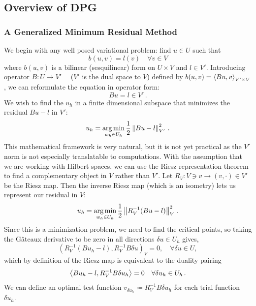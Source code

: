 \documentclass{article}
\begin{document}
\subsection{Overview of DPG}
\subsubsection{A Generalized Minimum Residual Method}
We begin with any well posed variational problem: find $u\in U$ such that
\[
b(u,v)=l(v) \quad\forall v\in V
\]
where $b(u,v)$ is a bilinear (sesquilinear) form on $U\times V$ and $l\in V'$.
Introducing operator $B:U\rightarrow V'\quad$ ($V'$ is the dual space to $V$) defined by $b(u,v)=\left\langle Bu,v \right\rangle_{V'\times V}$,
we can reformulate the equation in operator form:
\[
Bu=l\in V'\,.
\]
We wish to find the $u_h$ in a finite dimensional subspace that minimizes the residual $Bu-l$ in $V'$:
\[
u_h=\operatorname*{arg\,min}_{w_h\in U_h}\frac{1}{2}\left\| Bu-l \right\|^2_{V'}\,.
\]
This mathematical framework is very natural, but it is not yet practical as the $V'$ norm is not especially translatable to computations.
With the assumption that we are working with Hilbert spaces, 
we can use the Riesz representation theorem to find a complementary object in $V$ rather than $V'$. 
Let $R_V:V\ni v\rightarrow(v,\cdot)\in V'$ be the Riesz map. 
Then the inverse Riesz map (which is an isometry) lets us represent our residual in $V$:
\[
u_h=\operatorname*{arg\,min}_{w_h\in U_h}\frac{1}{2}\left\| R_V^{-1}(Bu-l) \right\|^2_{V}\,.
\]
Since this is a minimization problem, we need to find the critical points, so
taking the G\^ateaux derivative to be zero in all directions $\delta u \in
U_h$ gives,
\[
\left(R_V^{-1}(Bu_h-l),R_V^{-1}B\delta u\right)_V = 0, \quad \forall \delta u \in U,
\]
which by definition of the Riesz map is equivalent to the duality pairing
\begin{equation*}
\left\langle Bu_h-l,R_V^{-1}B\delta u_h \right\rangle=0\quad\forall\delta u_h\in U_h\,.
\end{equation*}
We can define an optimal test function $v_{\delta u_h}\coloneqq R_V^{-1}B\delta u_h$ for each trial function $\delta u_h$.
\end{document}
